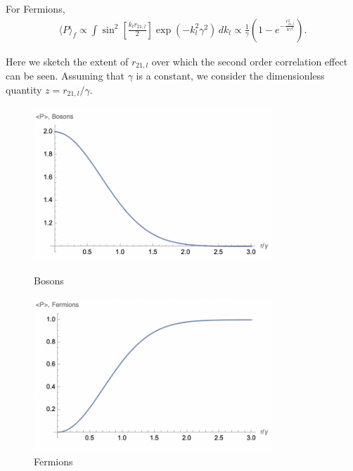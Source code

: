 \documentclass{article}
\theoremstyle{definition}
\newcommand{\f}[2]{\frac{#1}{#2}}
\newcommand{\lp}{\left(}
\newcommand{\rp}{\right)}
\newcommand{\lb}{\left[}
\newcommand{\rb}{\right]}
\begin{document}
\begin{enumerate}[label=(\alph*)]
\begin{itemize}
\noindent For Fermions,
\begin{align*}
\langle P \rangle_f 
\propto \int \sin^2\lb \f{k_l r_{21,l}}{2} \rb \exp\lp -k_l^2 \gamma^2 \rp\,d k_l \propto \f{1}{\gamma}\lp 1 -  e^{- \f{r_{21,l}^2 }{ 4\gamma^2}} \rp.
\end{align*}

Here we sketch the extent of $r_{21,l}$ over which the second order correlation effect can be seen. Assuming that $\gamma$ is a constant, we consider the dimensionless quantity $z = r_{21,l}/\gamma$. \\

\begin{figure}[!htb]
\centering
\begin{minipage}{0.4\textwidth}
\centering
\includegraphics[width=0.8\textwidth]{figures/bosons_pic.png}
\caption{Bosons}
\end{minipage}
\begin{minipage}{0.4\textwidth}
\centering
\includegraphics[width=0.8\textwidth]{figures/fermions_pic.png}
\caption{Fermions}
\end{minipage}
\end{figure}




\end{itemize}
\end{enumerate}
\end{document}
